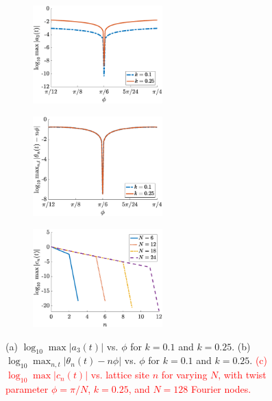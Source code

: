\documentclass[11pt,reqno]{amsart}
\newcommand{\revised}[1]{ \textcolor{red}{#1} }
\begin{document}
\begin{figure}
    \centering
    \begin{subfigure}{0.3\linewidth}
        \caption{}
        \label{fig:m6suppa3}
        \includegraphics[width=5cm]{a3phicont.eps}
    \end{subfigure}
    \begin{subfigure}{0.3\linewidth}
        \caption{}
        \label{fig:m6supptheta}
        \includegraphics[width=5cm]{thetaphicont.eps}
    \end{subfigure}
    \begin{subfigure}{0.3\linewidth}
        \caption{}
        \label{fig:suppN}
        \includegraphics[width=5cm]{suppressionN.eps}
    \end{subfigure}
    \caption{(a) $\log_{10} \max |a_3(t)|$ vs. $\phi$ for $k=0.1$ and $k=0.25$. (b) $\log_{10} \max_{n,t}{|\theta_n(t) - n \phi|}$ vs. $\phi$ for $k=0.1$ and $k=0.25$.
    \revised{(c) $\log_{10} \max |c_n(t)|$ vs. lattice site $n$ for varying $N$, with twist parameter $\phi=\pi/N$, $k=0.25$, and $N=128$ Fourier nodes.}}
    \label{fig:m6supp}
\end{figure}
\end{document}
